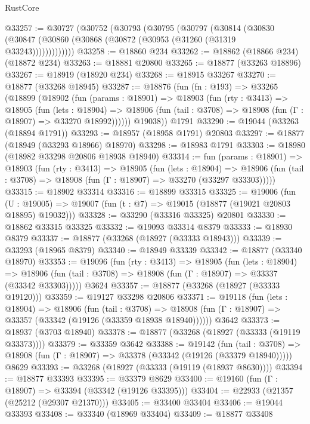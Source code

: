 \begin{lexlean}{RustCore}
\begin{coremodule}
@33257 := @30727
    (@30752
      (@30793
        (@30795
          (@30797
            (@30814
              (@30830 (@30847 (@30860 (@30868 (@30872 (@30953 (@31260 (@31319 @33243)))))))))))))
@33258 := @18860 @234
@33262 := @18862 (@18866 @234) (@18872 @234)
@33263 := @18881 @20800
@33265 := @18877 (@33263 @18896)
@33267 := @18919 (@18920 @234)
@33268 := @18915 @33267
@33270 := @18877 (@33268 @18945)
@33287 := @18876
    (fun (fn : @193) =>
    @33265
      (@18899
        (@18902
          (fun (params : @18901) =>
          @18903
            (fun (rty : @3413) =>
            @18905
              (fun (lets : @18904) =>
              @18906 (fun (tail : @3708) => @18908 (fun (Γ : @18907) => @33270 @18992))))))
        @19038))
    @1791
@33290 := @19044 (@33263 (@18894 @1791))
@33293 := @18957 (@18958 @1791) @20803
@33297 := @18877 (@18949 (@33293 @18966) @18970)
@33298 := @18983 @1791
@33303 := @18980 (@18982 @33298 @20806 @18938 @18940)
@33314 := fun (params : @18901) =>
  @18903
    (fun (rty : @3413) =>
    @18905
      (fun (lets : @18904) =>
      @18906 (fun (tail : @3708) => @18908 (fun (Γ : @18907) => @33270 (@33297 @33303)))))
@33315 := @18902 @33314
@33316 := @18899 @33315
@33325 := @19006
    (fun (U : @19005) => @19007 (fun (t : @7) => @19015 (@18877 (@19021 @20803 @18895) @19032)))
@33328 := @33290 (@33316 @33325) @20801
@33330 := @18862 @33315 @33325
@33332 := @19093 @33314 @8379
@33333 := @18930 @8379
@33337 := @18877 (@33268 (@18927 (@33333 @18943)))
@33339 := @33293 (@18965 @8379)
@33340 := @18949 @33339
@33342 := @18877 (@33340 @18970)
@33353 := @19096
    (fun (rty : @3413) =>
    @18905
      (fun (lets : @18904) =>
      @18906 (fun (tail : @3708) => @18908 (fun (Γ : @18907) => @33337 (@33342 @33303)))))
    @3624
@33357 := @18877 (@33268 (@18927 (@33333 @19120)))
@33359 := @19127 @33298 @20806
@33371 := @19118
    (fun (lets : @18904) =>
    @18906
      (fun (tail : @3708) =>
      @18908 (fun (Γ : @18907) => @33357 (@33342 (@19126 (@33359 @18938 @18940))))))
    @3642
@33373 := @18937 (@3703 @18940)
@33378 := @18877 (@33268 (@18927 (@33333 (@19119 @33373))))
@33379 := @33359 @3642
@33388 := @19142
    (fun (tail : @3708) => @18908 (fun (Γ : @18907) => @33378 (@33342 (@19126 (@33379 @18940)))))
    @8629
@33393 := @33268 (@18927 (@33333 (@19119 (@18937 @8630))))
@33394 := @18877 @33393
@33395 := @33379 @8629
@33400 := @19160 (fun (Γ : @18907) => @33394 (@33342 (@19126 @33395)))
@33404 := @22933 (@21357 (@25212 (@29307 @21370)))
@33405 := @33400 @33404
@33406 := @19044 @33393
@33408 := @33340 (@18969 @33404)
@33409 := @18877 @33408

\end{coremodule}
\end{lexlean}
